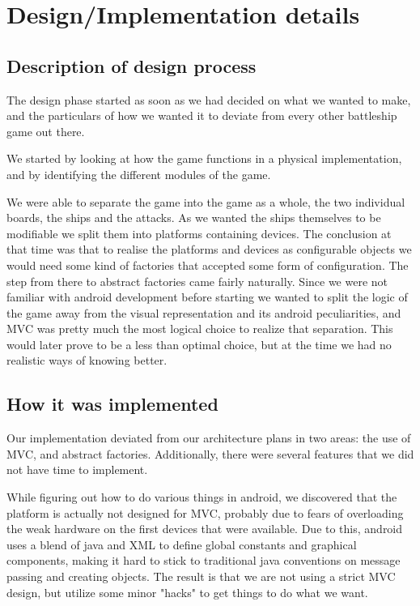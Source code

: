 \documentclass[12pt, a4paper]{article}
\begin{document}
\section{Design/Implementation details}
\subsection{Description of design process}
The design phase started as soon as we had decided on what we wanted to make, and the particulars of how we wanted it to deviate from every other battleship game out there.

We started by looking at how the game functions in a physical implementation, and by identifying the different modules of the game.

We were able to separate the game into the game as a whole, the two individual boards, the ships and the attacks. As we wanted the ships themselves to be modifiable we split them into platforms containing devices. The conclusion at that time was that to realise the platforms and devices as configurable objects we would need some kind of factories that accepted some form of configuration. The step from there to abstract factories came fairly naturally.
Since we were not familiar with android development before starting we wanted to split the logic of the game away from the visual representation and its android peculiarities, and MVC was pretty much the most logical choice to realize that separation. This would later prove to be a less than optimal choice, but at the time we had no realistic ways of knowing better.
\subsection{How it was implemented}

Our implementation deviated from our architecture plans in two areas: the use of
MVC, and abstract factories. Additionally, there were several features that we
did not have time to implement.

While figuring out how to do various things in android, we discovered that the
platform is actually not designed for MVC, probably due to fears of overloading
the weak hardware on the first devices that were available. Due to this, android
uses a blend of java and XML to define global constants and graphical
components, making it hard to stick to traditional java conventions on message
passing and creating objects. The result is that we are not using a strict MVC
design, but utilize some minor "hacks" to get things to do what we want.
\end{document}
